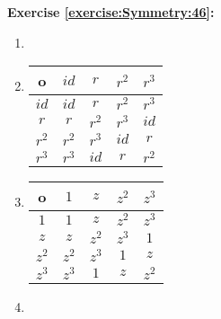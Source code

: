 \noindent\textbf{Exercise \ref{exercise:Symmetry:46}:}
\begin{enumerate}[{a.}]
\item

\item 
\begin{tabular}{c| c c c c}
		o & $id$ & $r$ & $r^2$ & $r^3$\\
		\hline
		$id$ & $id$ & $r$ & $r^2$ & $r^3$\\
		$r$ & $r$ & $r^2$ & $r^3$ & $id$\\
		$r^2$ & $r^2$ & $r^3$ & $id$ & $r$\\
		$r^3$ & $r^3$ & $id$ & $r$ & $r^2$
	\end{tabular}
	
\item 
\begin{tabular}{c| c c c c}
		o & $1$ & $z$ & $z^2$ & $z^3$\\
		\hline
		$1$ & $1$ & $z$ & $z^2$ & $z^3$\\
		$z$ & $z$ & $z^2$ & $z^3$ & $1$\\
		$z^2$ & $z^2$ & $z^3$ & $1$ & $z$\\
		$z^3$ & $z^3$ & $1$ & $z$ & $z^2$
	\end{tabular}
	
\item
\end{enumerate}
